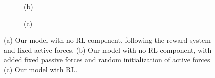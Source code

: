 \documentclass[9pt]{pnas-new}
\begin{document}
\begin{figure}[ht]
\begin{subfigure}{0.30\textwidth}
		\vspace{0.5em}
		\centering (b)
	\end{subfigure}
	\hfill
	\begin{subfigure}{0.30\textwidth}
		\centering
		\vspace{0.5em}
		\centering (c)
	\end{subfigure}
	
	\caption{(a) Our model with no RL component, following the reward system and fixed active forces. (b) Our model with no RL component, with added fixed passive forces and random initialization of active forces (c) Our model with RL.}
	\label{fig:three_images}
\end{figure}
\end{document}

